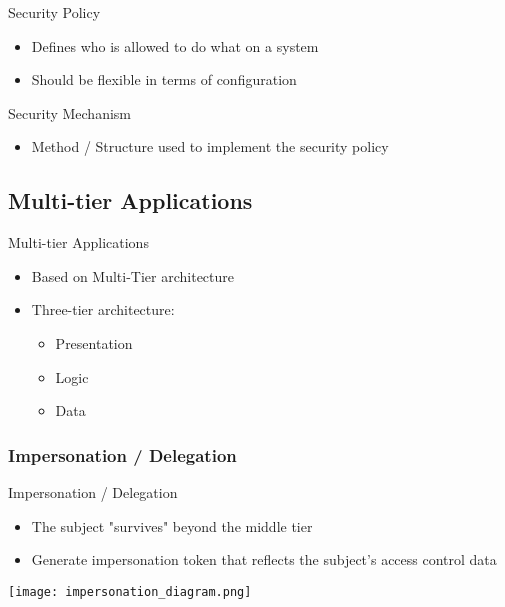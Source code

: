 \begin{definition}{Security Policy}\\
    \begin{itemize}
        \item Defines who is allowed to do what on a system
        \item Should be flexible in terms of configuration
    \end{itemize}
\end{definition}

\begin{definition}{Security Mechanism}\\
    \begin{itemize}
        \item Method / Structure used to implement the security policy
    \end{itemize}
\end{definition}

\subsection{Multi-tier Applications}

\begin{concept}{Multi-tier Applications}\\
    \begin{itemize}
        \item Based on Multi-Tier architecture
        \item Three-tier architecture:
        \begin{itemize}
            \item Presentation
            \item Logic  
            \item Data
        \end{itemize}
    \end{itemize}
\end{concept}

\subsubsection{Impersonation / Delegation}

\begin{definition}{Impersonation / Delegation}\\
    \begin{itemize}
        \item The subject "survives" beyond the middle tier
        \item Generate impersonation token that reflects the subject's access control data
    \end{itemize}
    
    \texttt{[image: impersonation\_diagram.png]}
\end{definition}

